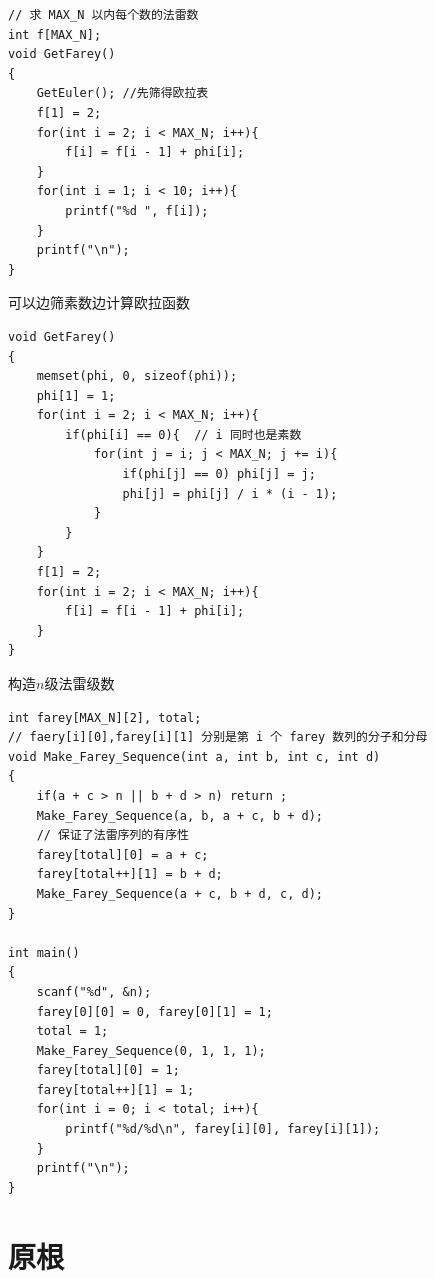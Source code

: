\begin{lstlisting}
// 求 MAX_N 以内每个数的法雷数
int f[MAX_N];
void GetFarey()
{
    GetEuler(); //先筛得欧拉表
    f[1] = 2;
    for(int i = 2; i < MAX_N; i++){
        f[i] = f[i - 1] + phi[i];
    }
    for(int i = 1; i < 10; i++){
        printf("%d ", f[i]);
    }
    printf("\n");
}
\end{lstlisting}

可以边筛素数边计算欧拉函数
\begin{lstlisting}
void GetFarey()
{
    memset(phi, 0, sizeof(phi));
    phi[1] = 1;
    for(int i = 2; i < MAX_N; i++){
        if(phi[i] == 0){  // i 同时也是素数
            for(int j = i; j < MAX_N; j += i){
                if(phi[j] == 0) phi[j] = j;
                phi[j] = phi[j] / i * (i - 1);
            }
        }
    }
    f[1] = 2;
    for(int i = 2; i < MAX_N; i++){
        f[i] = f[i - 1] + phi[i];
    }
}
\end{lstlisting}

构造$n$级法雷级数
\begin{lstlisting}
int farey[MAX_N][2], total;
// faery[i][0],farey[i][1] 分别是第 i 个 farey 数列的分子和分母
void Make_Farey_Sequence(int a, int b, int c, int d)
{
    if(a + c > n || b + d > n) return ;
    Make_Farey_Sequence(a, b, a + c, b + d);
    // 保证了法雷序列的有序性
    farey[total][0] = a + c;
    farey[total++][1] = b + d;
    Make_Farey_Sequence(a + c, b + d, c, d);
}

int main()
{
    scanf("%d", &n);
    farey[0][0] = 0, farey[0][1] = 1;
    total = 1;
    Make_Farey_Sequence(0, 1, 1, 1);
    farey[total][0] = 1;
    farey[total++][1] = 1;
    for(int i = 0; i < total; i++){
        printf("%d/%d\n", farey[i][0], farey[i][1]);
    }
    printf("\n");
}
\end{lstlisting}

\section{原根}
